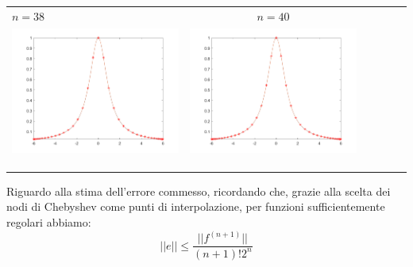 \begin{tabular}{l*{5}{c}}
\hspace{3.5cm}\(n=38\) &  \(n=40\) \\
\includegraphics[scale=0.5]{cap4/4_7/38.png} &  \includegraphics[scale=0.5]{cap4/4_7/40.png} \\
& \\
& \\
& \\
\end{tabular}


\noindent Riguardo alla stima dell'errore commesso, ricordando che, grazie alla scelta dei nodi di Chebyshev come punti di interpolazione, per funzioni sufficientemente regolari abbiamo:
\[
||e|| \leq \frac{||f^{(n+1)}||}{(n+1)!2^n}
\]

